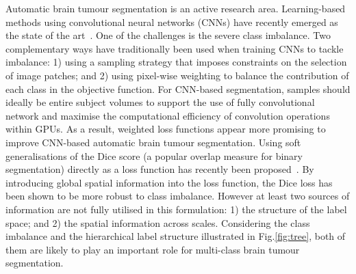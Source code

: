 \documentclass[runningheads,orivec,a4paper]{llncs}
\begin{document}
Automatic brain tumour segmentation is an active research area.
%
Learning-based methods using convolutional neural networks (CNNs) have recently emerged as the state of the art~\cite{Havaei2017,deep_medic}.
%
%
One of the challenges is the severe class imbalance.
%
Two complementary ways have traditionally been used when training CNNs to tackle
imbalance: 1) using a sampling strategy that imposes
constraints on the selection of image patches; and 2) using pixel-wise weighting
to balance the contribution of each class in the objective function. 
%
%
%
For CNN-based segmentation, samples should ideally be entire
subject volumes to support the use of fully convolutional network and
maximise the computational efficiency of
convolution operations within GPUs.  
%
As a result, weighted loss functions appear more promising to improve
CNN-based automatic brain tumour
segmentation. 
%
%
Using soft generalisations of the Dice score (a popular
overlap measure for binary segmentation) directly as a loss function has
recently been proposed~\cite{v_net,Sudre2017}. By introducing global spatial
information into the loss function, the Dice loss has been shown to be
more robust to class imbalance.  
%
%
However at least two sources of information are not fully utilised in this formulation: 1) the
structure of the label space; and 2) the spatial information  across scales.
%
Considering the class imbalance and the hierarchical label structure illustrated in Fig.\ref{fig:tree}, both of them are likely to play an important role for multi-class brain
tumour segmentation. 
\end{document}
